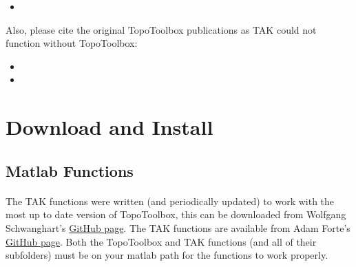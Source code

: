 \begin{itemize}
	\item {}
\end{itemize}

Also, please cite the original TopoToolbox publications as TAK could not function without TopoToolbox:

\begin{itemize}
	\item {} 
	\item {}
\end{itemize}

\section{Download and Install} \label{sec:dwnld}

\subsection{Matlab Functions}

\paragraph{}The TAK functions were written (and periodically updated) to work with the most up to date version of TopoToolbox, this can be downloaded from Wolfgang Schwanghart's \href{https://github.com/wschwanghart/topotoolbox}{GitHub page}. The TAK functions are available from Adam Forte's \href{https://github.com/amforte/Topographic-Analysis-Kit}{GitHub page}. Both the TopoToolbox and TAK functions (and all of their subfolders) must be on your matlab path for the functions to work properly.

